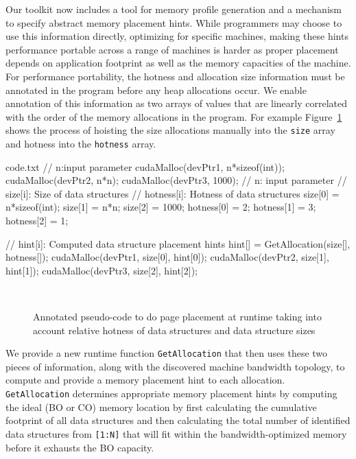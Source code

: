 Our toolkit now includes a tool for memory profile generation and a mechanism to specify
abstract memory placement hints. While programmers may choose to use this information
directly, optimizing for specific machines, making these hints performance portable across a range of machines
is harder as proper placement depends on application footprint as well as the memory
capacities of the machine. For performance portability,
the hotness and allocation size information must be annotated in the program before any heap allocations occur.
We enable annotation of this information as two arrays of values
that are linearly correlated with the order of the memory allocations in the program.
For example Figure~\ref{fig:code} shows the process of hoisting the size
allocations manually into the {\tt size} array and hotness into the {\tt hotness} array. 

\lstset { %
    language=C++,
    basicstyle=\footnotesize,%
    captionpos=b,
    frame=top,frame=bottom
}
\begin{filecontents*}{code.txt}
// n:input parameter
cudaMalloc(devPtr1, n*sizeof(int));
cudaMalloc(devPtr2, n*n);
cudaMalloc(devPtr3, 1000);
// n: input parameter
// size[i]: Size of data structures
// hotness[i]: Hotness of data structures
size[0] = n*sizeof(int);
size[1] = n*n;
size[2] = 1000;
hotness[0] = 2;
hotness[1] = 3;
hotness[2] = 1;

// hint[i]: Computed data structure placement hints
hint[] = GetAllocation(size[], hotness[]);
cudaMalloc(devPtr1, size[0], hint[0]);
cudaMalloc(devPtr2, size[1], hint[1]);
cudaMalloc(devPtr3, size[2], hint[2]);
\end{filecontents*}

\begin{figure}[t]
    \\
    \hfill
    \caption{Annotated pseudo-code to do page placement at runtime taking into account
relative hotness of data structures and data structure sizes}
    \label{fig:code}
\end{figure}

We provide a new runtime function {\tt GetAllocation} that then uses these two
pieces of information, along with the discovered machine bandwidth topology, to
compute and provide a memory placement hint to each allocation. {\tt
GetAllocation} determines appropriate memory placement hints by computing the
ideal (BO or CO) memory location by first calculating the cumulative footprint
of all data structures and then calculating the total number of identified data
structures from {\tt[1:N]} that will fit within the bandwidth-optimized memory
before it exhausts the BO capacity.


